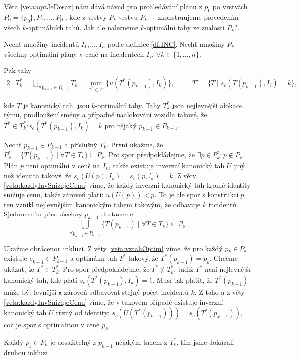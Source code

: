 Věta \ref{veta:optJeDosaz} nám dává návod pro prohledávání plánu z $p_0$ po vrstvách $P_0 = \{ p_0\}, P_1, \dots, P_{|I|}$, 
kde z vrstvy $P_k$ vrstvu $P_{k+1}$ zkonstruujeme provedením všech $k$-optimálních tahů.
Jak ale nalezneme $k$-optimální tahy ze znalosti $P_k$?.

\begin{veta}\label{veta:konkrOptTahy}
  Nechť množiny incidentů $I_1, \dots, I_n$ podle definice \ref{df:INC}.
  Nechť množiny $P_{k}$ všechny optimální plány v ceně na incidentech $I_k$, $\forall k \in \{ 1, \dots, n \}$.

  Pak tahy 
  \begin{alignat*}{2}
    & T^*_k = \bigcup_{\forall p_{k-1} \in P_{k-1}} T_k = \min_{T^* \in T'} \{ u(T^*(p_{k-1}), I_k) \}, \quad && T' = \{ T \mid s_c(T(p_{k-1}), I_k) = k \},
  \end{alignat*}

  kde $T$ je kanonický tah, jsou $k$-optimální tahy.
  Tahy $T^*_k$ jsou nejlevnější alokace týmu, prodloužení směny a případně naalokování vozidla takové,
  že $T^* \in T^*_k \colon s_c(T^*(p_{k-1}), I_k) = k$ pro nějaký $p_{k-1} \in P_{k-1}$.
\end{veta}
\begin{dukaz}
  Nechť $p_{k-1} \in P_{k-1}$ a příslušný $T_k$. První ukažme, že $P^*_k = \{ T(p_{k-1}) \mid \forall T \in T_k \} \subseteq P_k$.
  Pro spor předpokládejme, že $\exists p \in P^*_k \colon p \not \in P_k$.
  Plán $p$ není optimální v ceně na $I_k$, takže existuje inverzní kanonický tah $U$ jiný než identita takový, že $s_c(U(p), I_k) = s_c(p, I_k) = k$.
  Z věty \ref{veta:kazdyInvSnizujeCenu} víme, že každý inverzní kanonický tah kromě identity snižuje cenu, takže zároveň platí: $u(U(p)) < p$.
  To je ale spor s konstrukcí $p$, ten vznikl nejlevnějším kanonickým tahem takovým, že odbavuje $k$ incidentů.
  Sjednocením přes všechny $p_{k-1}$ dostaneme 
  \begin{equation*}
    \bigcup_{\forall p_{k-1} \in P_{k-1}} \{ T(p_{k-1}) \mid \forall T \in T_k \} \subseteq P_k.
  \end{equation*}

  Ukažme obrácenou inkluzi. Z věty \ref{veta:vztahOptim} víme, že pro každý $p_k \in P_k$ existuje $p_{k-1} \in P_{k-1}$ a optimální tah $T^*$ takový,
  že $T^*(p_{k-1}) = p_k$. Chceme ukázat, že $T^* \in T^*_k$.
  Pro spor předpokládejme, že $T^* \not \in T^*_k$, tudiž $T^*$ není nejlevnější kanonický tah, kde platí $s_c(T^*(p_{k-1}), I_k) = k$.
  Musí tak platit, že $T^*(p_{k-1})$ může být levnější a zároveň odbavovat stejný počet incidentů $k$. 
  Z toho a z věty \ref{veta:kazdyInvSnizujeCenu} víme, že v takovém případě existuje inverzní kanonický tah $U$ různý od identity: $s_c(U(T^*(p_{k-1}))) = s_c(T^*(p_{k-1}))$,
  což je spor s optimalitou v ceně $p_k$.

  Každý $p_k \in P_k$ je dosažitelný z $p_{k-1}$ nějakým tahem z $T^*_k$, tím jsme dokázali druhou inkluzi.
\end{dukaz}

